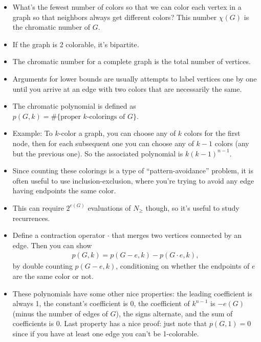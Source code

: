 \documentclass{article}
\begin{document}
\begin{itemize}
  \item What's the fewest number of colors so that we can color each vertex in a
    graph so that neighbors always get different colors? This number
    $\chi\left(G\right)$ is the chromatic number of $G$.
  \item If the graph is 2 colorable, it's bipartite.
  \item The chromatic number for a complete graph is the total number of vertices.
  \item Arguments for lower bounds are usually attempts to label vertices one by
    one until you arrive at an edge with two colors that are necessarily the
    same.
  \item The chromatic polynomial is defined as $p\left(G, k\right) =
    \#\{\text{proper }k\text{-colorings of }G\}$.
  \item Example: To $k$-color a graph, you can choose any of $k$ colors for
    the first node, then for each subsequent one you can choose any of $k -
    1$ colors (any but the previous one). So the associated polynomial is
    $k\left(k - 1\right)^{n - 1}$.
  \item Since counting these colorings is a type of ``pattern-avoidance''
    problem, it is often useful to use inclusion-exclusion, where you're
    trying to avoid any edge having endpoints the same color.
  \item This can require $2^{e\left(G\right)}$ evaluations of $N_{\geq}$
    though, so it's useful to study recurrences.
  \item Define a contraction operator $\cdot$ that merges two vertices connected
    by an edge. Then you can show
    \begin{align}
      p\left(G, k\right) = p\left(G - e, k\right) - p\left(G \cdot e, k\right),
    \end{align}
    by double counting $p\left(G - e, k\right)$, conditioning on whether the
    endpoints of $e$ are the same color or not.
  \item These polynomials have some other nice properties: the leading
    coefficient is always 1, the constant's coefficient is 0, the coefficient of
    $k^{n - 1}$ is $-e\left(G\right)$ (minus the number of edges of $G$),
    the signs alternate, and the sum of coefficients is 0. Last property has a
    nice proof: just note that $p\left(G, 1\right) = 0$ since if you have at
    least one edge you can't be 1-colorable.
\end{itemize}
\end{document}
